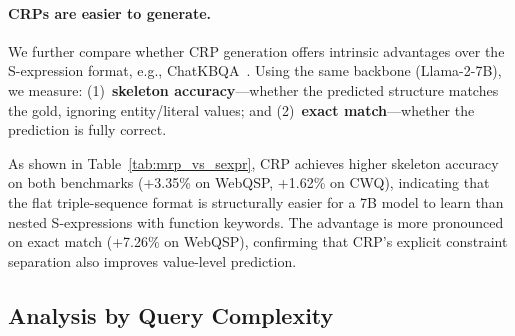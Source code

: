 \documentclass[11pt]{article}
\begin{document}
\begin{table}[t]
\centering
\small
\setlength{\tabcolsep}{3pt}
\caption{First-prediction generation accuracy (\%) of ChatKBQA (S-expression) and RouterKGQA (CRP), both using Llama-2-7B.}
\label{tab:mrp_vs_sexpr}
\end{table}

\paragraph{CRPs are easier to generate.}
We further compare whether CRP generation offers intrinsic advantages over the S-expression format, e.g., ChatKBQA~\citep{luo-etal-2024-chatkbqa}. Using the same backbone (Llama-2-7B), we measure: (1)~\textbf{skeleton accuracy}---whether the predicted structure matches the gold, ignoring entity/literal values; and (2)~\textbf{exact match}---whether the prediction is fully correct.

As shown in Table~\ref{tab:mrp_vs_sexpr}, CRP achieves higher skeleton accuracy on both benchmarks (+3.35\% on WebQSP, +1.62\% on CWQ), indicating that the flat triple-sequence format is structurally easier for a 7B model to learn than nested S-expressions with function keywords. The advantage is more pronounced on exact match (+7.26\% on WebQSP), confirming that CRP's explicit constraint separation also improves value-level prediction.


\subsection{Analysis by Query Complexity}
\label{sec:complexity_analysis}
\end{document}
